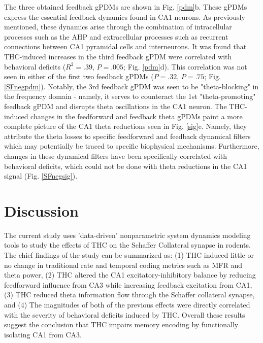 \documentclass[11pt,a4paper,final]{article}
\begin{document}
The three obtained feedback gPDMs are shown in Fig. \ref{pdm}b.
These gPDMs express the essential feedback dynamics found in CA1 neurons.
As previously mentioned, these dynamics arise through the combination of intracellular processes such as the AHP and extracellular processes such as recurrent connections between CA1 pyramidal cells and interneurons.
It was found that THC-induced increases in the third feedback gPDM were correlated with behavioral deficits ($R^2=.39$, $P=.005$; Fig. \ref{pdm}d).
This correlation was not seen in either of the first two feedback gPDMs ($P=.32$, $P=.75$; Fig. \ref{SFnegpdm}).
Notably, the 3rd feedback gPDM was seen to be "theta-blocking" in the frequency domain - namely, it serves to counteract the 1st "theta-promoting" feedback gPDM and disrupts theta oscillations in the CA1 neuron.
The THC-induced changes in the feedforward and feedback theta gPDMs paint a more complete picture of the CA1 theta reductions seen in Fig. \ref{sig}e.
Namely, they attribute the theta losses to specific feedforward and feedback dynamical filters which may potentially be traced to specific biophysical mechanisms.
Furthermore, changes in these dynamical filters have been specifically correlated with behavioral deficits, which could not be done with theta reductions in the CA1 signal (Fig. \ref{SFnegsig}).

\section{Discussion \label{disc}}

The current study uses 'data-driven' nonparametric system dynamics modeling tools to study the effects of THC on the Schaffer Collateral synapse in rodents.
The chief findings of the study can be summarized as:
(1) THC induced little or no change in traditional rate and temporal coding metrics such as MFR and theta power, 	
(2) THC altered the CA1 excitatory-inhibitory balance by reducing feedforward influence from CA3 while increasing feedback excitation from CA1,
(3) THC reduced theta information flow through the Schaffer collateral synapse,
and (4) The magnitudes of both of the previous effects were directly correlated with the severity of behavioral deficits induced by THC.
Overall these results suggest the conclusion that THC impairs memory encoding by functionally isolating CA1 from CA3.
\end{document}
